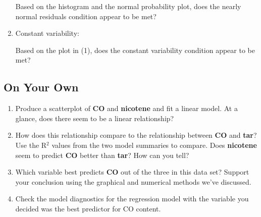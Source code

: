 \documentclass{article}\usepackage[]{graphicx}\usepackage[]{color}
\newcommand{\hlkwd}[1]{\textcolor[rgb]{0.737,0.353,0.396}{\textbf{#1}}}%
\begin{document}
\begin{enumerate}
\begin{exercise}
Based on the histogram and the normal probability plot, does the nearly normal residuals condition appear to be met?
\end{exercise}

\item Constant variability:

\begin{exercise}
Based on the plot in (1), does the constant variability condition appear to be met? 
\end{exercise}

\end{enumerate}

\vspace{2cm}

\subsection*{On Your Own}

\begin{enumerate}
\item Produce a scatterplot of \hlkwd{CO} and \hlkwd{nicotene} and fit a linear model.  At a glance, does there seem to be a linear relationship?

\item How does this relationship compare to the relationship between \hlkwd{CO} and \hlkwd{tar}? Use the R$^2$ values from the two model summaries to compare.  Does \hlkwd{nicotene} seem to predict \hlkwd{CO} better than \hlkwd{tar}?  How can you tell? 

\item Which variable best predicts \hlkwd{CO} out of the three in this data set? Support your conclusion using the graphical and numerical methods we've discussed.

\item Check the model diagnostics for the regression model with the variable you decided was the best predictor for CO content.

\end{enumerate}
\end{document}
